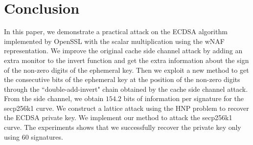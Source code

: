 \section{Conclusion}
\label{sec:conclusion}
In this paper, we demonstrate a practical attack on the ECDSA algorithm implemented by OpenSSL with the scalar multiplication using the wNAF representation.
We improve the original cache side channel attack by adding an extra monitor to the invert function and get the extra information about the sign of the non-zero digits of the ephemeral key.
Then we exploit a new method to get the consecutive bits of the ephemeral key at the position of the non-zero digits through the ``double-add-invert" chain obtained by the cache side channel attack.
From the side channel, we obtain $154.2$ bits of information per signature for the secp256k1 curve.
We construct a lattice attack using the HNP problem to recover the ECDSA private key.
We implement our method to attack the secp256k1 curve.
The experiments shows that we successfully recover the private key only using $60$ signatures.






